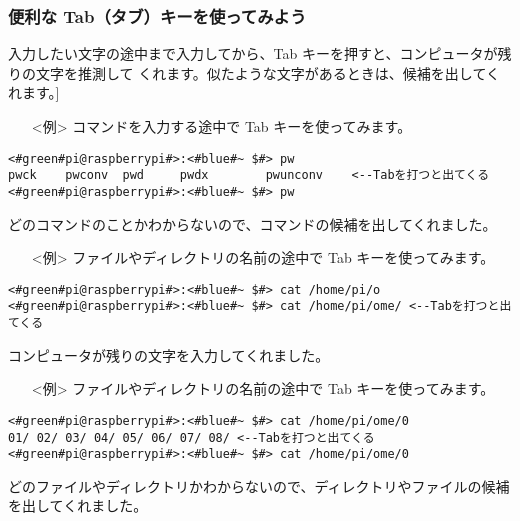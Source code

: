 \subsubsection{便利な Tab（タブ）キーを使ってみよう}
入力したい文字の途中まで入力してから、Tab キーを押すと、コンピュータが残りの文字を推測して
くれます。似たような文字があるときは、候補を出してくれます。]
\begin{itemize}
\item[<例>]コマンドを入力する途中で Tab キーを使ってみます。
\end{itemize}
\begin{lstlisting}[caption=Tabの例1, label=Tab1]
<#green#pi@raspberrypi#>:<#blue#~ $#> pw
pwck	pwconv	pwd		pwdx		pwunconv	<--Tabを打つと出てくる
<#green#pi@raspberrypi#>:<#blue#~ $#> pw
\end{lstlisting}
どのコマンドのことかわからないので、コマンドの候補を出してくれました。
\begin{itemize}
\item[<例>]ファイルやディレクトリの名前の途中で Tab キーを使ってみます。
\end{itemize}
\begin{lstlisting}[caption=Tabの例2, label=Tab2]
<#green#pi@raspberrypi#>:<#blue#~ $#> cat /home/pi/o
<#green#pi@raspberrypi#>:<#blue#~ $#> cat /home/pi/ome/	<--Tabを打つと出てくる
\end{lstlisting}
コンピュータが残りの文字を入力してくれました。
\begin{itemize}
\item[<例>]ファイルやディレクトリの名前の途中で Tab キーを使ってみます。
\end{itemize}
\begin{lstlisting}[caption=Tabの例3, label=Tab3]
<#green#pi@raspberrypi#>:<#blue#~ $#> cat /home/pi/ome/0
01/	02/	03/	04/	05/	06/	07/	08/	<--Tabを打つと出てくる
<#green#pi@raspberrypi#>:<#blue#~ $#> cat /home/pi/ome/0
\end{lstlisting}
どのファイルやディレクトリかわからないので、ディレクトリやファイルの候補を出してくれました。